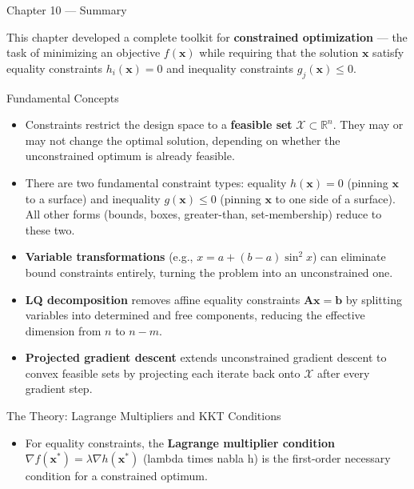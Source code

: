 \documentclass[aspectratio=169,10pt]{beamer}
\newcommand{\R}{\mathbb{R}}
\newcommand{\bx}{\mathbf{x}}
\newcommand{\bA}{\mathbf{A}}
\newcommand{\bb}{\mathbf{b}}
\begin{document}
\begin{frame}[allowframebreaks]{Chapter 10 --- Summary}

  This chapter developed a complete toolkit for \textbf{constrained
  optimization} --- the task of minimizing an objective $f(\bx)$ while
  requiring that the solution $\bx$ satisfy equality constraints $h_i(\bx) = 0$
  and inequality constraints $g_j(\bx) \le 0$.

  \begin{block}{Fundamental Concepts}
    \begin{itemize}
      \item Constraints restrict the design space to a \textbf{feasible set}
            $\mathcal{X} \subset \R^n$.  They may or may not change the
            optimal solution, depending on whether the unconstrained optimum
            is already feasible.

      \item There are two fundamental constraint types: equality $h(\bx) = 0$
            (pinning $\bx$ to a surface) and inequality $g(\bx) \le 0$ (pinning
            $\bx$ to one side of a surface).  All other forms (bounds, boxes,
            greater-than, set-membership) reduce to these two.

      \item \textbf{Variable transformations} (e.g., $x = a + (b-a)\sin^2\hat{x}$)
            can eliminate bound constraints entirely, turning the problem into
            an unconstrained one.

      \item \textbf{LQ decomposition} removes affine equality constraints
            $\bA\bx = \bb$ by splitting variables into determined and free
            components, reducing the effective dimension from $n$ to $n - m$.

      \item \textbf{Projected gradient descent} extends unconstrained gradient
            descent to convex feasible sets by projecting each iterate back onto
            $\mathcal{X}$ after every gradient step.
    \end{itemize}
  \end{block}

  \framebreak

  \begin{block}{The Theory: Lagrange Multipliers and KKT Conditions}
    \begin{itemize}
      \item For equality constraints, the \textbf{Lagrange multiplier condition}
            $\nabla f(\bx^*) = \lambda \nabla h(\bx^*)$ (lambda times nabla h)
            is the first-order necessary condition for a constrained optimum.


\end{itemize}
\end{block}
\end{frame}
\end{document}
